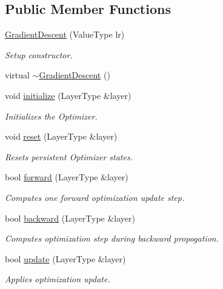 \subsection*{Public Member Functions}
\begin{DoxyCompactItemize}
\item 
\hyperlink{class_gradient_descent_a2493f9a96fb8eb22aa6eac2fe2af1948}{Gradient\-Descent} (Value\-Type lr)
\begin{DoxyCompactList}\small\item\em Setup constructor. \end{DoxyCompactList}\item 
virtual \hyperlink{class_gradient_descent_ae86436201e4c6e041837c815de3eb4d4}{$\sim$\-Gradient\-Descent} ()
\item 
void \hyperlink{class_gradient_descent_a1915d0839e2605a95214a8df3fc81109}{initialize} (Layer\-Type \&layer)
\begin{DoxyCompactList}\small\item\em Initializes the Optimizer. \end{DoxyCompactList}\item 
void \hyperlink{class_gradient_descent_aa6b1c9d30473fdf4dc2616665e6d1952}{reset} (Layer\-Type \&layer)
\begin{DoxyCompactList}\small\item\em Resets persistent Optimizer states. \end{DoxyCompactList}\item 
bool \hyperlink{class_gradient_descent_add831bddf60b4ee8ee68b964ccb8b6bb}{forward} (Layer\-Type \&layer)
\begin{DoxyCompactList}\small\item\em Computes one forward optimization update step. \end{DoxyCompactList}\item 
bool \hyperlink{class_gradient_descent_ad9096611d288da2427dbce4261eeca99}{backward} (Layer\-Type \&layer)
\begin{DoxyCompactList}\small\item\em Computes optimization step during backward propogation. \end{DoxyCompactList}\item 
bool \hyperlink{class_gradient_descent_ac66c2ab70fd324b1b09c0593bb0132af}{update} (Layer\-Type \&layer)
\begin{DoxyCompactList}\small\item\em Applies optimization update. \end{DoxyCompactList}\end{DoxyCompactItemize}
